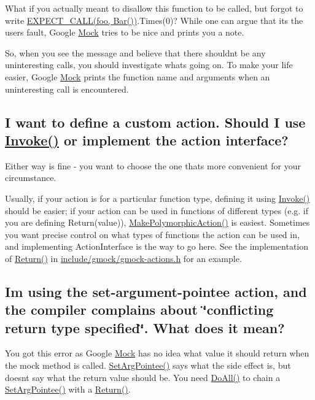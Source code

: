 What if you actually meant to disallow this function to be called, but forgot to write {\ttfamily \hyperlink{gmock-spec-builders_8h_a535a6156de72c1a2e25a127e38ee5232}{E\+X\+P\+E\+C\+T\+\_\+\+C\+A\+L\+L(foo, Bar())}.Times(0)}? While one can argue that it\textquotesingle{}s the user\textquotesingle{}s fault, Google \hyperlink{classMock}{Mock} tries to be nice and prints you a note.

So, when you see the message and believe that there shouldn\textquotesingle{}t be any uninteresting calls, you should investigate what\textquotesingle{}s going on. To make your life easier, Google \hyperlink{classMock}{Mock} prints the function name and arguments when an uninteresting call is encountered.

\subsection*{I want to define a custom action. Should I use \hyperlink{namespacetesting_a12aebaf8363d49a383047529f798b694}{Invoke()} or implement the action interface?}

Either way is fine -\/ you want to choose the one that\textquotesingle{}s more convenient for your circumstance.

Usually, if your action is for a particular function type, defining it using {\ttfamily \hyperlink{namespacetesting_a12aebaf8363d49a383047529f798b694}{Invoke()}} should be easier; if your action can be used in functions of different types (e.\+g. if you are defining {\ttfamily Return(value)}), {\ttfamily \hyperlink{namespacetesting_a36bd06c5ea972c6df0bd9f40a7a94c65}{Make\+Polymorphic\+Action()}} is easiest. Sometimes you want precise control on what types of functions the action can be used in, and implementing {\ttfamily Action\+Interface} is the way to go here. See the implementation of {\ttfamily \hyperlink{namespacetesting_af6d1c13e9376c77671e37545cd84359c}{Return()}} in {\ttfamily \hyperlink{gmock-actions_8h}{include/gmock/gmock-\/actions.\+h}} for an example.

\subsection*{I\textquotesingle{}m using the set-\/argument-\/pointee action, and the compiler complains about \char`\"{}conflicting return type specified\char`\"{}. What does it mean?}

You got this error as Google \hyperlink{classMock}{Mock} has no idea what value it should return when the mock method is called. {\ttfamily \hyperlink{namespacetesting_a5740a5033b88c37666fcd09a269d123f}{Set\+Arg\+Pointee()}} says what the side effect is, but doesn\textquotesingle{}t say what the return value should be. You need {\ttfamily \hyperlink{namespacetesting_a5f533932753d2af95000e96c4a3042e3}{Do\+All()}} to chain a {\ttfamily \hyperlink{namespacetesting_a5740a5033b88c37666fcd09a269d123f}{Set\+Arg\+Pointee()}} with a {\ttfamily \hyperlink{namespacetesting_af6d1c13e9376c77671e37545cd84359c}{Return()}}.


